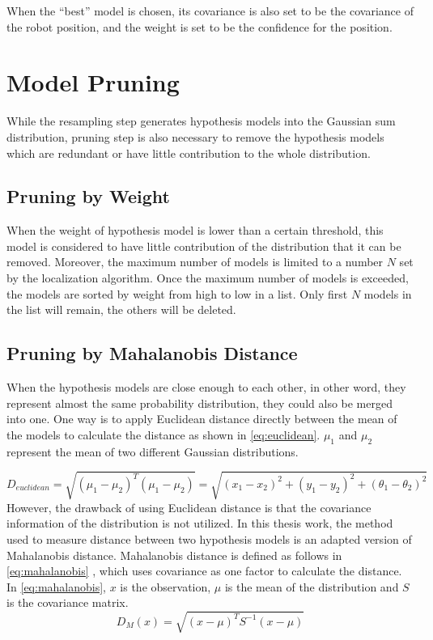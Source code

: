 When the ``best'' model is chosen, its covariance is also set to be the covariance of the robot position, and the weight is set to be the confidence for the position.

\section{Model Pruning}\label{sec:pruning}
While the resampling step generates hypothesis models into the Gaussian sum distribution, pruning step is also necessary to remove the hypothesis models which are redundant or have little contribution to the whole distribution.

\subsection{Pruning by Weight}
\label{sub:Pruning by Weight}
When the weight of hypothesis model is lower than a certain threshold, this model is considered to have little contribution of the distribution that it can be removed. Moreover, the maximum number of models is limited to a number $N$ set by the localization algorithm. Once the maximum number of models is exceeded, the models are sorted by weight from high to low in a list. Only first $N$ models in the list will remain, the others will be deleted.

\subsection{Pruning by Mahalanobis Distance \cite{de2000mahalanobis}}
\label{sub:Prunning Mahalanobis Distance}
When the hypothesis models are close enough to each other, in other word, they represent almost the same probability distribution, they could also be merged into one. One way is to apply Euclidean distance directly between the mean of the models to calculate the distance as shown in \autoref{eq:euclidean}. $\mu_1$ and $\mu_2$ represent the mean of two different Gaussian distributions.

\begin{equation}
\label{eq:euclidean}
D_{euclidean} = \sqrt{(\mu_1 - \mu_2)^T(\mu_1 - \mu_2)}= \sqrt{(x_{1}-x_{2})^2 + (y_{1}-y_{2})^2 + (\theta_{1}-\theta_{2})^2}
\end{equation}
However, the drawback of using Euclidean distance is that the covariance information of the distribution is not utilized. In this thesis work, 
the method used to measure distance between two hypothesis models is an adapted version of Mahalanobis distance. Mahalanobis distance is defined as follows in \autoref{eq:mahalanobis} \cite{de2000mahalanobis}, which uses covariance as one factor to calculate the distance. In \autoref{eq:mahalanobis}, $x$ is the observation, $\mu$ is the mean of the distribution and $S$ is the covariance matrix.
\begin{equation}
\label{eq:mahalanobis}
D_M(x) = \sqrt{(x - \mu)^T S^{-1} (x-\mu)}
\end{equation}


